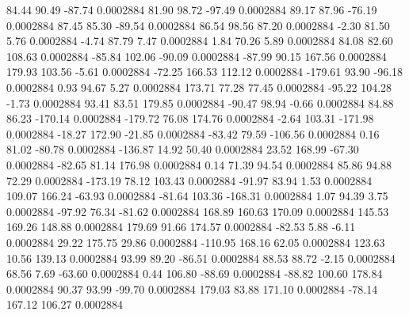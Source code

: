        84.44       90.49      -87.74     0.0002884
       81.90       98.72      -97.49     0.0002884
       89.17       87.96      -76.19     0.0002884
       87.45       85.30      -89.54     0.0002884
       86.54       98.56       87.20     0.0002884
       -2.30       81.50        5.76     0.0002884
       -4.74       87.79        7.47     0.0002884
        1.84       70.26        5.89     0.0002884
       84.08       82.60      108.63     0.0002884
      -85.84      102.06      -90.09     0.0002884
      -87.99       90.15      167.56     0.0002884
      179.93      103.56       -5.61     0.0002884
      -72.25      166.53      112.12     0.0002884
     -179.61       93.90      -96.18     0.0002884
        0.93       94.67        5.27     0.0002884
      173.71       77.28       77.45     0.0002884
      -95.22      104.28       -1.73     0.0002884
       93.41       83.51      179.85     0.0002884
      -90.47       98.94       -0.66     0.0002884
       84.88       86.23     -170.14     0.0002884
     -179.72       76.08      174.76     0.0002884
       -2.64      103.31     -171.98     0.0002884
      -18.27      172.90      -21.85     0.0002884
      -83.42       79.59     -106.56     0.0002884
        0.16       81.02      -80.78     0.0002884
     -136.87       14.92       50.40     0.0002884
       23.52      168.99      -67.30     0.0002884
      -82.65       81.14      176.98     0.0002884
        0.14       71.39       94.54     0.0002884
       85.86       94.88       72.29     0.0002884
     -173.19       78.12      103.43     0.0002884
      -91.97       83.94        1.53     0.0002884
      109.07      166.24      -63.93     0.0002884
      -81.64      103.36     -168.31     0.0002884
        1.07       94.39        3.75     0.0002884
      -97.92       76.34      -81.62     0.0002884
      168.89      160.63      170.09     0.0002884
      145.53      169.26      148.88     0.0002884
      179.69       91.66      174.57     0.0002884
      -82.53        5.88       -6.11     0.0002884
       29.22      175.75       29.86     0.0002884
     -110.95      168.16       62.05     0.0002884
      123.63       10.56      139.13     0.0002884
       93.99       89.20      -86.51     0.0002884
       88.53       88.72       -2.15     0.0002884
       68.56        7.69      -63.60     0.0002884
        0.44      106.80      -88.69     0.0002884
      -88.82      100.60      178.84     0.0002884
       90.37       93.99      -99.70     0.0002884
      179.03       83.88      171.10     0.0002884
      -78.14      167.12      106.27     0.0002884
